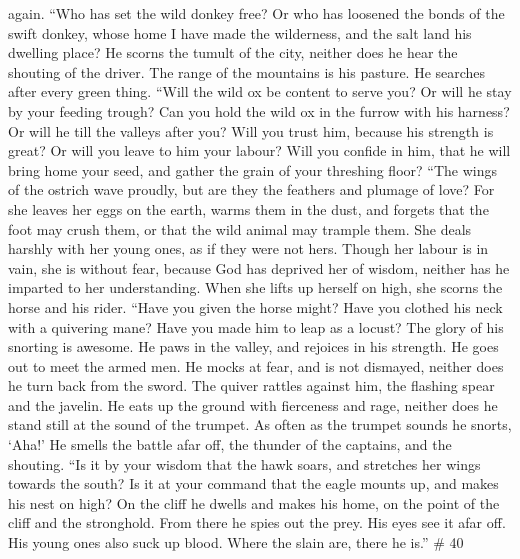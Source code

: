 again.  ``Who has set the wild donkey free? Or who has
loosened the bonds of the swift donkey,  whose home I have
made the wilderness, and the salt land his dwelling place?
 He scorns the tumult of the city, neither does he hear
the shouting of the driver.  The range of the mountains is
his pasture. He searches after every green thing.  ``Will
the wild ox be content to serve you? Or will he stay by your feeding
trough?  Can you hold the wild ox in the furrow with his
harness? Or will he till the valleys after you?  Will you
trust him, because his strength is great? Or will you leave to him your
labour?  Will you confide in him, that he will bring home
your seed, and gather the grain of your threshing floor? 
``The wings of the ostrich wave proudly, but are they the feathers and
plumage of love?  For she leaves her eggs on the earth,
warms them in the dust,  and forgets that the foot may
crush them, or that the wild animal may trample them. 
She deals harshly with her young ones, as if they were not hers. Though
her labour is in vain, she is without fear,  because God
has deprived her of wisdom, neither has he imparted to her
understanding.  When she lifts up herself on high, she
scorns the horse and his rider.  ``Have you given the
horse might? Have you clothed his neck with a quivering mane?
 Have you made him to leap as a locust? The glory of his
snorting is awesome.  He paws in the valley, and rejoices
in his strength. He goes out to meet the armed men.  He
mocks at fear, and is not dismayed, neither does he turn back from the
sword.  The quiver rattles against him, the flashing
spear and the javelin.  He eats up the ground with
fierceness and rage, neither does he stand still at the sound of the
trumpet.  As often as the trumpet sounds he snorts,
`Aha!' He smells the battle afar off, the thunder of the captains, and
the shouting.  ``Is it by your wisdom that the hawk
soars, and stretches her wings towards the south?  Is it
at your command that the eagle mounts up, and makes his nest on high?
 On the cliff he dwells and makes his home, on the point
of the cliff and the stronghold.  From there he spies out
the prey. His eyes see it afar off.  His young ones also
suck up blood. Where the slain are, there he is.'' \# 40 
